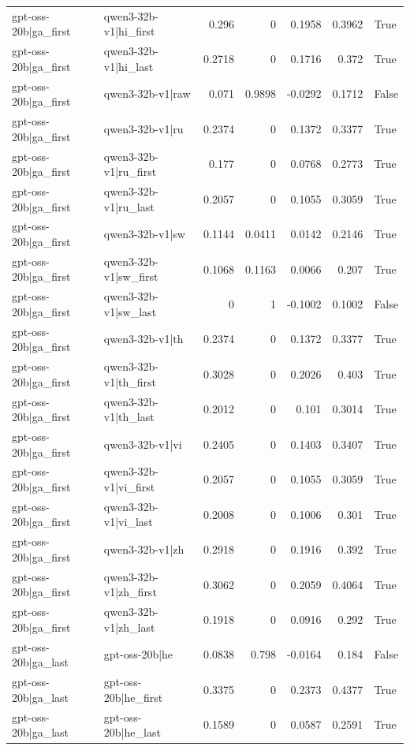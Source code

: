 \begin{table}
\begin{tabular}{l l r r r r l}
gpt-oss-20b|ga_first & qwen3-32b-v1|hi_first & 0.296 & 0 & 0.1958 & 0.3962 & True \\
gpt-oss-20b|ga_first & qwen3-32b-v1|hi_last & 0.2718 & 0 & 0.1716 & 0.372 & True \\
gpt-oss-20b|ga_first & qwen3-32b-v1|raw & 0.071 & 0.9898 & -0.0292 & 0.1712 & False \\
gpt-oss-20b|ga_first & qwen3-32b-v1|ru & 0.2374 & 0 & 0.1372 & 0.3377 & True \\
gpt-oss-20b|ga_first & qwen3-32b-v1|ru_first & 0.177 & 0 & 0.0768 & 0.2773 & True \\
gpt-oss-20b|ga_first & qwen3-32b-v1|ru_last & 0.2057 & 0 & 0.1055 & 0.3059 & True \\
gpt-oss-20b|ga_first & qwen3-32b-v1|sw & 0.1144 & 0.0411 & 0.0142 & 0.2146 & True \\
gpt-oss-20b|ga_first & qwen3-32b-v1|sw_first & 0.1068 & 0.1163 & 0.0066 & 0.207 & True \\
gpt-oss-20b|ga_first & qwen3-32b-v1|sw_last & 0 & 1 & -0.1002 & 0.1002 & False \\
gpt-oss-20b|ga_first & qwen3-32b-v1|th & 0.2374 & 0 & 0.1372 & 0.3377 & True \\
gpt-oss-20b|ga_first & qwen3-32b-v1|th_first & 0.3028 & 0 & 0.2026 & 0.403 & True \\
gpt-oss-20b|ga_first & qwen3-32b-v1|th_last & 0.2012 & 0 & 0.101 & 0.3014 & True \\
gpt-oss-20b|ga_first & qwen3-32b-v1|vi & 0.2405 & 0 & 0.1403 & 0.3407 & True \\
gpt-oss-20b|ga_first & qwen3-32b-v1|vi_first & 0.2057 & 0 & 0.1055 & 0.3059 & True \\
gpt-oss-20b|ga_first & qwen3-32b-v1|vi_last & 0.2008 & 0 & 0.1006 & 0.301 & True \\
gpt-oss-20b|ga_first & qwen3-32b-v1|zh & 0.2918 & 0 & 0.1916 & 0.392 & True \\
gpt-oss-20b|ga_first & qwen3-32b-v1|zh_first & 0.3062 & 0 & 0.2059 & 0.4064 & True \\
gpt-oss-20b|ga_first & qwen3-32b-v1|zh_last & 0.1918 & 0 & 0.0916 & 0.292 & True \\
gpt-oss-20b|ga_last & gpt-oss-20b|he & 0.0838 & 0.798 & -0.0164 & 0.184 & False \\
gpt-oss-20b|ga_last & gpt-oss-20b|he_first & 0.3375 & 0 & 0.2373 & 0.4377 & True \\
gpt-oss-20b|ga_last & gpt-oss-20b|he_last & 0.1589 & 0 & 0.0587 & 0.2591 & True \\

\end{tabular}
\end{table}
